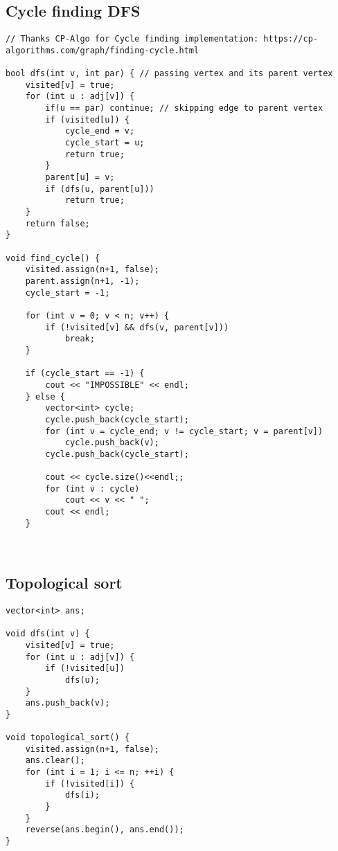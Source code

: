 \documentclass{article}
\begin{document}
\subsection{Cycle finding DFS}

\begin{lstlisting}
// Thanks CP-Algo for Cycle finding implementation: https://cp-algorithms.com/graph/finding-cycle.html
 
bool dfs(int v, int par) { // passing vertex and its parent vertex
    visited[v] = true;
    for (int u : adj[v]) {
        if(u == par) continue; // skipping edge to parent vertex
        if (visited[u]) {
            cycle_end = v;
            cycle_start = u;
            return true;
        }
        parent[u] = v;
        if (dfs(u, parent[u]))
            return true;
    }
    return false;
}

void find_cycle() {
    visited.assign(n+1, false);
    parent.assign(n+1, -1);
    cycle_start = -1;
 
    for (int v = 0; v < n; v++) {
        if (!visited[v] && dfs(v, parent[v]))
            break;
    }
 
    if (cycle_start == -1) {
        cout << "IMPOSSIBLE" << endl;
    } else {
        vector<int> cycle;
        cycle.push_back(cycle_start);
        for (int v = cycle_end; v != cycle_start; v = parent[v])
            cycle.push_back(v);
        cycle.push_back(cycle_start);
 
        cout << cycle.size()<<endl;;
        for (int v : cycle)
            cout << v << " ";
        cout << endl;
    }



\end{lstlisting}

\subsection{Topological sort}
\begin{lstlisting}
vector<int> ans;
 
void dfs(int v) {
    visited[v] = true;
    for (int u : adj[v]) {
        if (!visited[u])
            dfs(u);
    }
    ans.push_back(v);
}
 
void topological_sort() {
    visited.assign(n+1, false);
    ans.clear();
    for (int i = 1; i <= n; ++i) {
        if (!visited[i]) {
            dfs(i);
        }
    }
    reverse(ans.begin(), ans.end());
}
\end{lstlisting}
\end{document}
